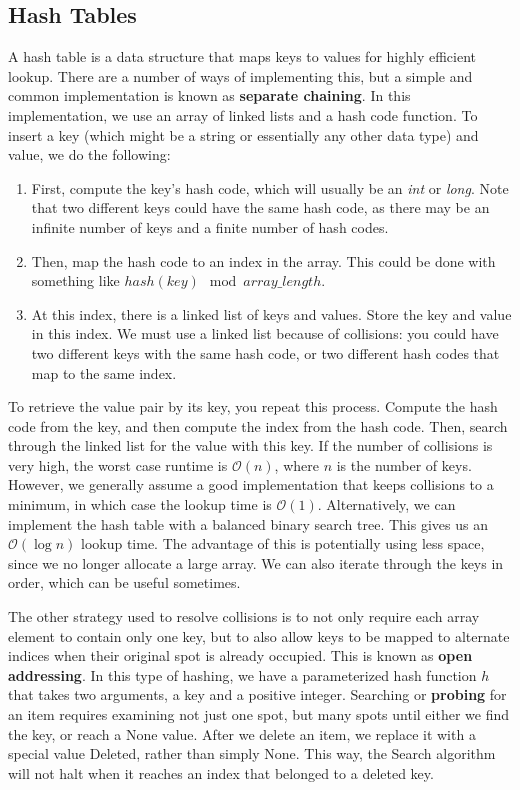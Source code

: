 \documentclass{article}
\newcommand{\bigO}{\mathcal{O}}
\begin{document}
    \subsection{Hash Tables}
    A hash table is a data structure that maps keys to values for highly efficient lookup. There are a number of ways of implementing this, but a simple and common implementation is known as \textbf{separate chaining}. In this implementation, we use an array of linked lists and a hash code function. To insert a key (which might be a string or essentially any other data type) and value, we do the following: 
    \begin{enumerate}
        \item 
        First, compute the key's hash code, which will usually be an \textit{int} or \textit{long}. Note that two different keys could have the same hash code, as there may be an infinite number of keys and a finite number of hash codes.
        \item
        Then, map the hash code to an index in the array. This could be done with something like $hash(key)\mod array\_length$. 
        \item
        At this index, there is a linked list of keys and values. Store the key and value in this index. We must use a linked list because of collisions: you could have two different keys with the same hash code, or two different hash codes that map to the same index.
    \end{enumerate}
    To retrieve the value pair by its key, you repeat this process. Compute the hash code from the key, and then compute the index from the hash code. Then, search through the linked list for the value with this key. If the number of collisions is very high, the worst case runtime is $\bigO(n)$, where $n$ is the number of keys. However, we generally assume a good implementation that keeps collisions to a minimum, in which case the lookup time is $\bigO(1)$. Alternatively, we can implement the hash table with a balanced binary search tree. This gives us an $\bigO(\log n)$ lookup time. The advantage of this is potentially using less space, since we no longer allocate a large array. We can also iterate through the keys in order, which can be useful sometimes.

    The other strategy used to resolve collisions is to not only require each array element to contain only one key, but to also allow keys to be mapped to alternate indices when their original spot is already occupied. This is known as \textbf{open addressing}. In this type of hashing, we have a parameterized hash function $h$ that takes two arguments, a key and a positive integer. Searching or \textbf{probing} for an item requires examining not just one spot, but many spots until either we find the key, or reach a None value. After we delete an item, we replace it with a special value Deleted, rather than simply None. This way, the Search algorithm will not halt when it reaches an index that belonged to a deleted key.
    
\end{document}
